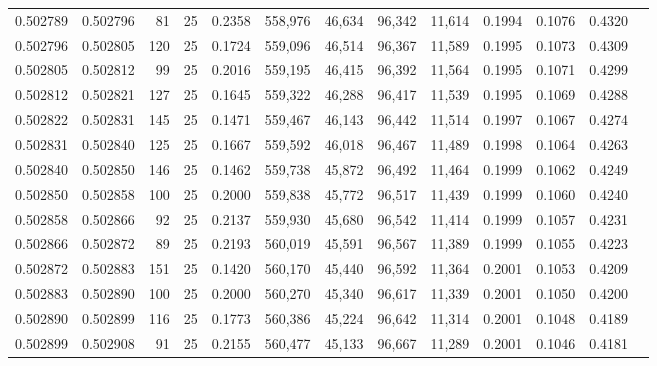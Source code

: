 \begin{tabular}{rrrrrrrrrrrrr}
0.502789 & 0.502796 &  81 &  25 &                                     0.2358 & 558,976 &  46,634 &  96,342 &  11,614 & 0.1994 & 0.1076 & 0.4320 \\
0.502796 & 0.502805 & 120 &  25 &                                     0.1724 & 559,096 &  46,514 &  96,367 &  11,589 & 0.1995 & 0.1073 & 0.4309 \\
0.502805 & 0.502812 &  99 &  25 &                                     0.2016 & 559,195 &  46,415 &  96,392 &  11,564 & 0.1995 & 0.1071 & 0.4299 \\
0.502812 & 0.502821 & 127 &  25 &                                     0.1645 & 559,322 &  46,288 &  96,417 &  11,539 & 0.1995 & 0.1069 & 0.4288 \\
0.502822 & 0.502831 & 145 &  25 &                                     0.1471 & 559,467 &  46,143 &  96,442 &  11,514 & 0.1997 & 0.1067 & 0.4274 \\
0.502831 & 0.502840 & 125 &  25 &                                     0.1667 & 559,592 &  46,018 &  96,467 &  11,489 & 0.1998 & 0.1064 & 0.4263 \\
0.502840 & 0.502850 & 146 &  25 &                                     0.1462 & 559,738 &  45,872 &  96,492 &  11,464 & 0.1999 & 0.1062 & 0.4249 \\
0.502850 & 0.502858 & 100 &  25 &                                     0.2000 & 559,838 &  45,772 &  96,517 &  11,439 & 0.1999 & 0.1060 & 0.4240 \\
0.502858 & 0.502866 &  92 &  25 &                                     0.2137 & 559,930 &  45,680 &  96,542 &  11,414 & 0.1999 & 0.1057 & 0.4231 \\
0.502866 & 0.502872 &  89 &  25 &                                     0.2193 & 560,019 &  45,591 &  96,567 &  11,389 & 0.1999 & 0.1055 & 0.4223 \\
0.502872 & 0.502883 & 151 &  25 &                                     0.1420 & 560,170 &  45,440 &  96,592 &  11,364 & 0.2001 & 0.1053 & 0.4209 \\
0.502883 & 0.502890 & 100 &  25 &                                     0.2000 & 560,270 &  45,340 &  96,617 &  11,339 & 0.2001 & 0.1050 & 0.4200 \\
0.502890 & 0.502899 & 116 &  25 &                                     0.1773 & 560,386 &  45,224 &  96,642 &  11,314 & 0.2001 & 0.1048 & 0.4189 \\
0.502899 & 0.502908 &  91 &  25 &                                     0.2155 & 560,477 &  45,133 &  96,667 &  11,289 & 0.2001 & 0.1046 & 0.4181 \\

\end{tabular}
